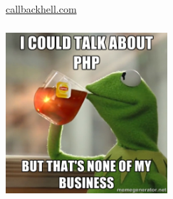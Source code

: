 \begin{frame}
  \begin{center}
    \huge\href{http://callbackhell.com}{callbackhell.com}
  \end{center}
\end{frame}
\begin{frame}
  \frametitle{}
  \begin{center}
    \includegraphics[width=6cm]{images/php}
  \end{center}
\end{frame}
